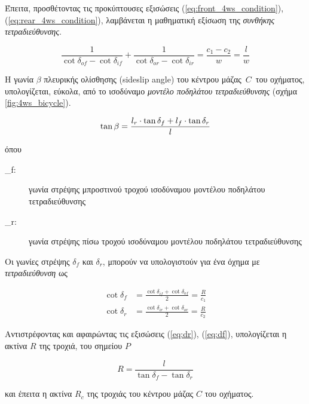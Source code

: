 \noindent
Έπειτα, προσθέτοντας τις προκύπτουσες εξισώσεις (\ref{eq:front_4ws_condition}), (\ref{eq:rear_4ws_condition}), λαμβάνεται η μαθηματική εξίσωση της \textit{συνθήκης τετραδιεύθυνσης}.

\begin{equation}
	\frac{1}{\cot{\delta_{of}} - \cot{\delta_{if}}} + \frac{1}{\cot{\delta_{or}} - \cot{\delta_{ir}}} = \frac{c_1 - c_2}{w} = \frac{l}{w}
	\label{eq:4ws_condition}
\end{equation}


\bigskip\bigskip
H γωνία $\beta$ πλευρικής ολίσθησης (sideslip angle) \cite{automated_odometry} του κέντρου μάζας $\,C\,$ του οχήματος, υπολογίζεται, εύκολα, από το ισοδύναμο \textit{μοντέλο ποδηλάτου τετραδιεύθυνσης} (σχήμα \ref{fig:4ws_bicycle}).

\begin{equation}
	\tan{\beta} = \frac{l_r \cdot \tan{\delta_f} + l_f \cdot \tan{\delta_r}}{l}
	\label{eq:neg_4ws_beta}\\
\end{equation} 

\noindent
όπου
\begin{description}
	\item[\delta_f:] γωνία στρέψης μπροστινού τροχού ισοδύναμου μοντέλου ποδηλάτου τετραδιεύθυνσης
	\item[\delta_r:] γωνία στρέψης πίσω τροχού ισοδύναμου μοντέλου ποδηλάτου τετραδιεύθυνσης
\end{description}

\bigskip
Οι γωνίες στρέψης $\delta_f$ και $\delta_r$, μπορούν να υπολογιστούν για ένα όχημα με \textit{τετραδιεύθυνση} ως

\begin{align}
	\cot{\delta_f} &= \frac{\cot{\delta_{if}} + \cot{\delta_{of}}}{2} = \frac{R}{c_1}
	\label{eq:df}\\
	\cot{\delta_r} &= \frac{\cot{\delta_{ir}} + \cot{\delta_{or}}}{2} = \frac{R}{c_2}
	\label{eq:dr}
\end{align}

\bigskip
Αντιστρέφοντας και αφαιρώντας τις εξισώσεις (\ref{eq:dr}), (\ref{eq:df}), υπολογίζεται η ακτίνα $R$ της τροχιά, του σημείου $P$

\begin{equation}
	R = \frac{l}{\tan{\delta_f} - \tan{\delta_r}}
	\label{eq:pos_p_turning_radius}
\end{equation}


\bigskip
\noindent
και έπειτα η ακτίνα $R_c$ της τροχιάς του κέντρου μάζας $C$ του οχήματος.

